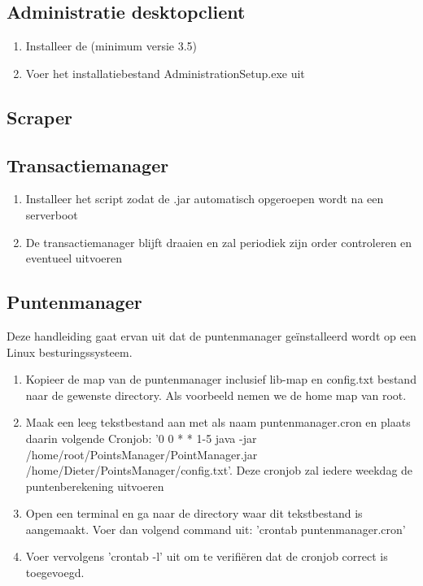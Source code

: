 \subsection{Administratie desktopclient}

\begin{enumerate}
\item Installeer de  (minimum versie 3.5)
\item{Voer het installatiebestand AdministrationSetup.exe uit}
\end{enumerate}

\subsection{Scraper}

\subsection{Transactiemanager}

\begin{enumerate}
\item{Installeer het script zodat de .jar automatisch opgeroepen wordt na een serverboot}
\item{De transactiemanager blijft draaien en zal periodiek zijn order controleren en eventueel uitvoeren}
\end{enumerate}

\subsection{Puntenmanager}
Deze handleiding gaat ervan uit dat de puntenmanager ge\"installeerd wordt op een Linux besturingssysteem.
\begin{enumerate}
\item{Kopieer de map van de puntenmanager inclusief lib-map en config.txt bestand naar de gewenste directory. Als voorbeeld nemen we de home map van root.}
\item{Maak een leeg tekstbestand aan met als naam puntenmanager.cron en plaats daarin volgende Cronjob: '0 0 * * 1-5 java -jar /home/root/PointsManager/PointManager.jar /home/Dieter/PointsManager/config.txt'. Deze cronjob zal iedere weekdag de puntenberekening uitvoeren}
\item{Open een terminal en ga naar de directory waar dit tekstbestand is aangemaakt.  Voer dan volgend command uit: 'crontab puntenmanager.cron'}
\item{Voer vervolgens 'crontab -l' uit om te verifi\"eren dat de cronjob correct is toegevoegd.}
\end{enumerate}

